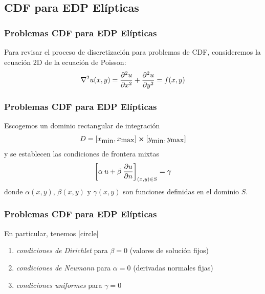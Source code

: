 \subsection{CDF para EDP Elípticas}
\begin{frame}
\frametitle{Problemas CDF para EDP Elípticas}
Para revisar el proceso de discretización para problemas de CDF, consideremos la ecuación 2D de la ecuación de Poisson:
\begin{align}
\laplacian{u(x, y)} = \pdv[2]{u}{x} + \pdv[2]{u}{y} = f(x, y)
\label{eq:ecuacion_13_01}
\end{align}
\end{frame}
\begin{frame}
\frametitle{Problemas CDF para EDP Elípticas}
Escogemos un dominio rectangular de integración
\begin{align*}
D = [x_{\mbox{min}}, x_{\mbox{max}} ] \cp [y_{\mbox{min}}, y_{\mbox{max}} ]
\end{align*}
y se establecen las condiciones de frontera mixtas
\begin{align}
\left[ \alpha \: u + \beta \: \pdv{u}{n} \right]_{(x, y) \in S} = \gamma
\label{eq:ecuacion_13_02}
\end{align}
donde $\alpha(x, y)$, $\beta(x, y)$ y $\gamma(x, y)$ son funciones definidas en el dominio $S$.
\end{frame}
\begin{frame}
\frametitle{Problemas CDF para EDP Elípticas}
En particular, tenemos
[circle]
\begin{enumerate}[<+->]
\item \emph{condiciones de Dirichlet} para $\beta = 0$ (valores de solución fijos)
\item \emph{condiciones de Neumann} para $\alpha = 0$ (derivadas normales fijas)
\item \emph{condiciones uniformes} para $\gamma = 0$
\end{enumerate}
\end{frame}
